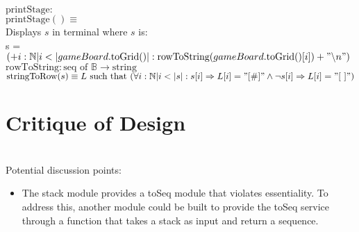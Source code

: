 \documentclass[12pt]{article}
\begin{document}
\noindent $\text{printStage} :$\\
\noindent
$\text{printStage}() \equiv$ \\
Displays $s$ in terminal where $s$ is: \\
s = $(+i: \mathbb{N} | i < |gameBoard.\text{toGrid}()| : \text{rowToString}(gameBoard.\text{toGrid()}[i]) + "\symbol{92} n")$ \\

\noindent $\text{rowToString} : \text{seq of }\mathbb{B} \rightarrow \text{string}$\\
\noindent
$\text{stringToRow}(s) \equiv L \text{ such that } (\forall i : \mathbb{N} | i < |s| : s[i] \Rightarrow L[i] = "[\#]" \land \lnot s[i] \Rightarrow L[i] = "[\ ]")$ \\

\newpage


\section*{Critique of Design}

\\

\noindent Potential discussion points:

\begin{itemize}
\item The stack module provides a toSeq module that violates essentiality.  To
  address this, another module could be built to provide the toSeq service
  through a function that takes a stack as input and return a sequence.
\end{itemize}
\end{document}
